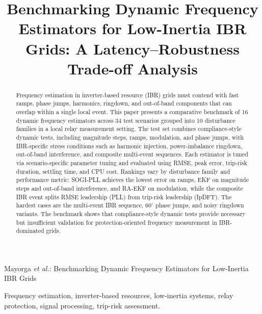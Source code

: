 \documentclass[conference,letterpaper]{IEEEtran}
\begin{document}
\title{Benchmarking Dynamic Frequency Estimators for Low-Inertia IBR Grids: A Latency--Robustness Trade-off Analysis}
\author{
}
%
{Mayorga \MakeLowercase{\textit{et al.}}: Benchmarking Dynamic Frequency Estimators for Low-Inertia IBR Grids}


\maketitle

\begin{abstract}
Frequency estimation in inverter-based resource (IBR) grids must contend with
fast ramps, phase jumps, harmonics, ringdown, and out-of-band components that
can overlap within a single local event. This paper presents a comparative
benchmark of 16 dynamic frequency estimators across 34 test scenarios grouped
into 10 disturbance families in a local relay measurement setting. The test set
combines compliance-style dynamic tests, including magnitude steps, ramps,
modulation, and phase jumps, with IBR-specific stress conditions such as
harmonic injection, power-imbalance ringdown, out-of-band interference, and
composite multi-event sequences. Each estimator is tuned via scenario-specific
parameter tuning and evaluated using RMSE, peak error, trip-risk duration,
settling time, and CPU cost. Rankings vary by disturbance family and
performance metric: SOGI-PLL achieves the lowest error on ramps, EKF on
magnitude steps and out-of-band interference, and RA-EKF on modulation, while
the composite IBR event splits RMSE leadership (PLL) from trip-risk leadership
(IpDFT). The hardest cases are the multi-event IBR sequence, $60^\circ$ phase
jumps, and noisy ringdown variants. The benchmark shows that compliance-style
dynamic tests provide necessary but insufficient validation for
protection-oriented frequency measurement in IBR-dominated grids.
\end{abstract}
\begin{IEEEkeywords}
Frequency estimation, inverter-based resources, low-inertia systems, relay
protection, signal processing, trip-risk assessment.
\end{IEEEkeywords}
\end{document}

